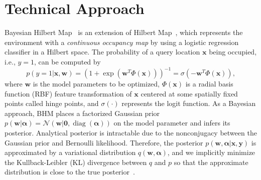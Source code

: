 
\section{Technical Approach}\label{sec:approach} %
Bayesian Hilbert Map~\cite{senanayake2017bayesian} is an extension of Hilbert Map~\cite{ramos2016hilbert}, which represents the environment with a \textit{continuous occupancy map} by using a logistic regression classifier in a Hilbert space.
The probability of a query location $\mathbf{x}$ being occupied, i.e., $y=1$, can be computed by
\begin{equation}
    \label{eq:logi}
    p(y=1|\mathbf{x}, \mathbf{w}) = \left ( 1 + \exp(\mathbf{w}^T\Phi(\mathbf{x})) \right )^{-1} = \sigma(-\mathbf{w}^T\Phi(\mathbf{x})),
\end{equation}
where $\mathbf{w}$ is the model parameters to be optimized, $\Phi(\mathbf{x})$ is a radial basis function (RBF) feature transformation of $\mathbf{x}$ centered at some spatially fixed points called hinge points, and $\sigma(\cdot)$ represents the logit function.
%
As a Bayesian approach, BHM places a factorized Gaussian prior $p(\mathbf{w}|\mathbf{\alpha})=\mathcal{N}\left(\mathbf{w}|\mathbf{0},\operatorname{diag}(\mathbf{\alpha})\right)$ on the model parameter and infers its posterior.
Analytical posterior is intractable due to the nonconjugacy between the Gaussian prior and Bernoulli likelihood.
Therefore, the posterior $p(\mathbf{w}, \mathbf{\alpha}|\mathbf{x}, \mathbf{y})$ is approximated by a variational distribution $q(\mathbf{w}, \mathbf{\alpha})$, and we implicitly minimize the Kullback-Leibler (KL) divergence between $q$ and $p$ so that the approximate distribution is close to the true posterior~\cite{senanayake2017bayesian}.

